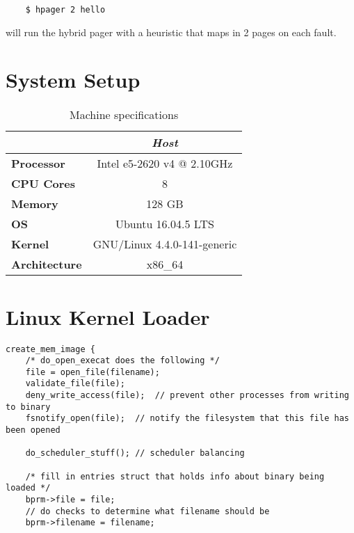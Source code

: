 \documentclass[a4paper]{article}
\begin{document}
{\begin{verbatim}
    $ hpager 2 hello
\end{verbatim}
 
    will run the hybrid pager with a heuristic that maps in 2 pages on each fault. 

 
\section{System Setup}

\begin{table}[htb!]
    \begin{center}
    \begin{tabular}{| l | c | }
        \hline
            & \textit{Host} \\ \hline \hline
            \textbf{Processor} & Intel e5-2620 v4 @ 2.10GHz \\ \hline
            \textbf{CPU Cores} & 8\\ \hline
            \textbf{Memory} & 128 GB\\ \hline
            \textbf{OS} & Ubuntu 16.04.5 LTS \\ \hline
            \textbf{Kernel} & GNU/Linux 4.4.0-141-generic \\ \hline

            \textbf{Architecture} & x86\_64 \\ \hline
        \hline
    \end{tabular}
    \caption{Machine specifications}\label{specs}
    \end{center}
    \end{table}



\section{Linux Kernel Loader}

\begin{verbatim}
create_mem_image {
    /* do_open_execat does the following */
    file = open_file(filename);
    validate_file(file);
    deny_write_access(file);  // prevent other processes from writing to binary
    fsnotify_open(file);  // notify the filesystem that this file has been opened
    
    do_scheduler_stuff(); // scheduler balancing
    
    /* fill in entries struct that holds info about binary being loaded */
    bprm->file = file;
    // do checks to determine what filename should be 
    bprm->filename = filename;  
    

\end{verbatim}}
\end{document}
